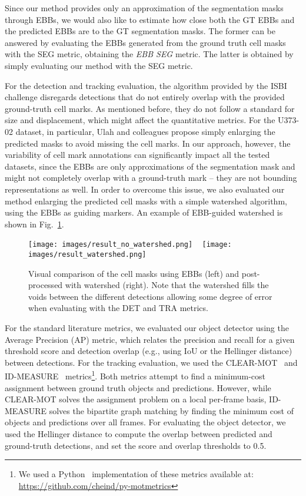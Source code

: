 \documentclass{article}
\begin{document}
Since our method provides only an approximation of the segmentation masks through EBBs, we would also like to estimate how close both the GT EBBs and the predicted EBBs are to the GT segmentation masks. The former can be answered by evaluating the EBBs generated from the ground truth cell masks with the SEG metric, obtaining the \emph{EBB SEG} metric. The latter is obtained by simply evaluating our method with the SEG metric.

For the detection and tracking evaluation, the algorithm provided by the ISBI challenge disregards detections that do not entirely overlap with the provided ground-truth cell marks. As mentioned before, they do not follow a standard for size and displacement, which might affect the quantitative metrics. For the  U373-02 dataset, in particular,  Ulah and colleagues \cite{cpn} propose simply enlarging the predicted masks to avoid missing the cell marks. In our approach, however, the variability of cell mark annotations can significantly impact all the tested datasets, since the EBBs are only approximations of the segmentation mask and might not completely overlap with a ground-truth mark -- they are not bounding representations as well. In order to overcome this issue, we also evaluated our method enlarging the predicted cell masks with a simple watershed algorithm, using the EBBs as guiding markers. An example of EBB-guided watershed is shown in Fig.~\ref{fig:watershed}. 

\begin{figure}[]
\centering
\texttt{[image: images/result\_no\_watershed.png]} ~
\texttt{[image: images/result\_watershed.png]}
\caption{Visual comparison of the cell masks using EBBs (left) and post-processed with watershed (right). Note that the watershed fills the voids between the different detections allowing some degree of error when evaluating with the DET and TRA metrics.}
\label{fig:watershed}
\end{figure}

For the standard literature metrics, we evaluated our object detector using the Average Precision (AP) metric, which relates the precision and recall for a given threshold score and detection overlap (e.g., using IoU or the Hellinger distance) between detections. For the tracking evaluation, we used the CLEAR-MOT~\cite{mota,mot16} and ID-MEASURE~\cite{mota_id} metrics\footnote{We used a Python~\cite{python} implementation of these metrics available at: \url{https://github.com/cheind/py-motmetrics}}. Both metrics attempt to find a minimum-cost assignment between ground truth objects and predictions. However, while CLEAR-MOT solves the assignment problem on a local per-frame basis, ID-MEASURE solves the bipartite graph matching by finding the minimum cost of objects and predictions over all frames. For evaluating the object detector, we used the Hellinger distance to compute the overlap between predicted and ground-truth detections, and set the score and overlap thresholds to 0.5.
\end{document}
